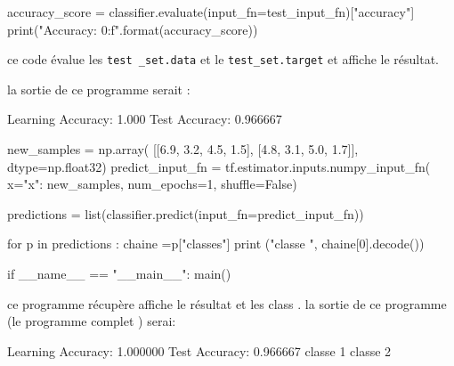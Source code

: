 \documentclass[a4paper,11pt]{book}
\theoremstyle{theo}
\begin{document}
\begin{mypython}
accuracy_score = classifier.evaluate(input_fn=test_input_fn)["accuracy"]
  print("\nTest Accuracy: {0:f}\n".format(accuracy_score))
\end{mypython}
ce code  évalue les \verb+test _set.data+  et le \verb+test_set.target+ et affiche  le résultat.  
 
la sortie de ce programme serait :
\begin{myoutput}
Learning Accuracy: 1.000
Test Accuracy: 0.966667
\end{myoutput}

\begin{mypython}
new_samples = np.array(
      [[6.9, 3.2, 4.5, 1.5],
       [4.8, 3.1, 5.0, 1.7]], dtype=np.float32)
  predict_input_fn = tf.estimator.inputs.numpy_input_fn(
      x={"x": new_samples},
      num_epochs=1,
      shuffle=False)

  predictions = list(classifier.predict(input_fn=predict_input_fn))
  
  for p in predictions :
    chaine =p["classes"]
    print ("classe ", chaine[0].decode()) 

if __name__ == "__main__":
    main()
\end{mypython}

ce programme récupère  affiche le résultat  et    les  class .
la sortie de  ce programme (le programme complet ) serai:
\begin{myoutput}
Learning Accuracy: 1.000000
Test Accuracy: 0.966667
classe  1
classe  2
\end{myoutput}
\end{document}
